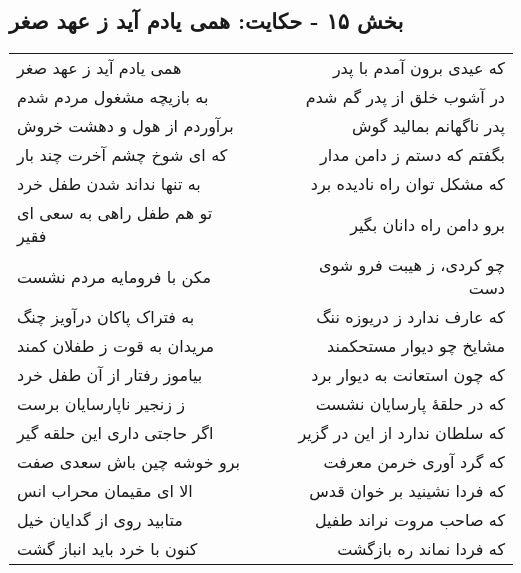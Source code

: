 \begin{center}
\section*{بخش ۱۵ - حکایت: همی یادم آید ز عهد صغر}
\label{sec:015}
\begin{longtable}{l p{0.5cm} r}
همی یادم آید ز عهد صغر
&&
که عیدی برون آمدم با پدر
\\
به بازیچه مشغول مردم شدم
&&
در آشوب خلق از پدر گم شدم
\\
برآوردم از هول و دهشت خروش
&&
پدر ناگهانم بمالید گوش
\\
که ای شوخ چشم آخرت چند بار
&&
بگفتم که دستم ز دامن مدار
\\
به تنها نداند شدن طفل خرد
&&
که مشکل توان راه نادیده برد
\\
تو هم طفل راهی به سعی ای فقیر
&&
برو دامن راه دانان بگیر
\\
مکن با فرومایه مردم نشست
&&
چو کردی، ز هیبت فرو شوی دست
\\
به فتراک پاکان درآویز چنگ
&&
که عارف ندارد ز دریوزه ننگ
\\
مریدان به قوت ز طفلان کمند
&&
مشایخ چو دیوار مستحکمند
\\
بیاموز رفتار از آن طفل خرد
&&
که چون استعانت به دیوار برد
\\
ز زنجیر ناپارسایان برست
&&
که در حلقهٔ پارسایان نشست
\\
اگر حاجتی داری این حلقه گیر
&&
که سلطان ندارد از این در گزیر
\\
برو خوشه چین باش سعدی صفت
&&
که گرد آوری خرمن معرفت
\\
الا ای مقیمان محراب انس
&&
که فردا نشینید بر خوان قدس
\\
متابید روی از گدایان خیل
&&
که صاحب مروت نراند طفیل
\\
کنون با خرد باید انباز گشت
&&
که فردا نماند ره بازگشت
\\
\end{longtable}
\end{center}
